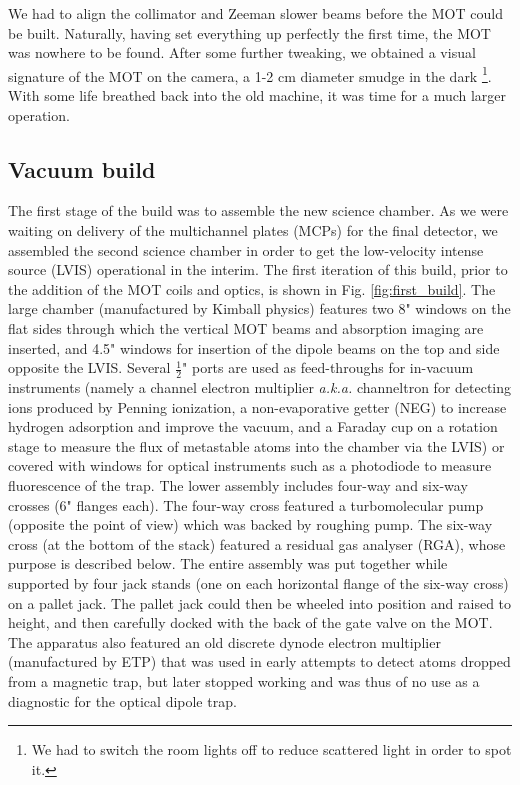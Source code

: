 	We had to align the collimator and Zeeman slower beams before the MOT could be built.
	Naturally, having set everything up perfectly the first time, the MOT was nowhere to be found.
	After some further tweaking, we obtained a visual signature of the MOT on the camera, a 1-2 cm diameter smudge in the dark \footnote{We had to switch the room lights off to reduce scattered light in order to spot it.}.
	With some life breathed back into the old machine, it was time for a much larger operation.


\subsection{Vacuum build}

	
	The first stage of the build was to assemble the new science chamber.
	As we were waiting on delivery of the multichannel plates (MCPs) for the final detector, we assembled the second science chamber in order to get the low-velocity intense source (LVIS) operational in the interim.
	The first iteration of this build, prior to the addition of the MOT coils and optics, is shown in Fig. \ref{fig:first_build}.
	The large chamber (manufactured by Kimball physics) features two 8" windows on the flat sides through which the vertical MOT beams and absorption imaging are inserted, and 4.5" windows for insertion of the dipole beams on the top and side opposite the LVIS.
	Several $\frac{1}{2}$" ports are used as feed-throughs for in-vacuum instruments (namely a channel electron multiplier \emph{a.k.a.} channeltron for detecting ions produced by Penning ionization, a non-evaporative getter (NEG) to increase hydrogen adsorption and improve the vacuum, and a Faraday cup on a rotation stage to measure the flux of metastable atoms into the chamber via the LVIS) or covered with windows for optical instruments such as a photodiode to measure fluorescence of the trap.
	The lower assembly includes four-way and six-way crosses (6" flanges each).
	The four-way cross featured a turbomolecular pump (opposite the point of view) which was backed by roughing pump.
	The six-way cross (at the bottom of the stack) featured a residual gas analyser (RGA), whose purpose is described below.
	The entire assembly was put together while supported by four jack stands (one on each horizontal flange of the six-way cross) on a pallet jack.
	The pallet jack could then be wheeled into position and raised to height, and then carefully docked with the back of the gate valve on the MOT.
	The apparatus also featured an old discrete dynode electron multiplier (manufactured by ETP) that was used in early attempts to detect atoms dropped from a magnetic trap, but later stopped working and was thus of no use as a diagnostic for the optical dipole trap.

